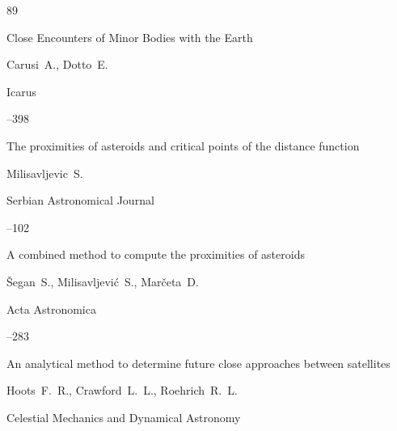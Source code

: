 \begin{thebibliography}{89}





\paper Close Encounters of Minor Bodies with the Earth

\by Carusi~A., Dotto~E.

\jour Icarus




–398






\paper The proximities of asteroids and critical points of the distance function

\by Milisavljevic~S.

\jour Serbian Astronomical Journal



–102






\paper A combined method to compute the proximities of asteroids

\by \v{S}egan~S., Milisavljevi\'c~S., Mar\v{c}eta~D.

\jour Acta Astronomica




–283





\paper An analytical method to determine future close approaches between satellites

\by Hoots~F.~R., Crawford~L.~L., Roehrich~R.~L.

\jour Celestial Mechanics and Dynamical Astronomy




\end{thebibliography}
